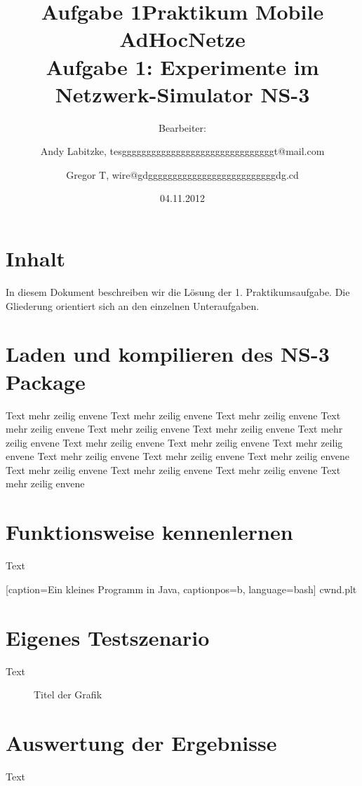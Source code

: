 \documentclass[12pt,a4paper,titlepage]{article}
\title{Aufgabe 1}
\begin{document}
\title{Praktikum Mobile AdHocNetze\\
	Aufgabe 1: Experimente im Netzwerk-Simulator NS-3}
\author{
Bearbeiter: \and
	Andy Labitzke, tesgggggggggggggggggggggggggggggggt@mail.com \and 
	Gregor T, wire@gdggggggggggggggggggggggggggdg.cd}
\date{04.11.2012}
\maketitle
\setcounter{page}{1}
\appendix

\section*{Inhalt}
In diesem Dokument beschreiben wir die Lösung der 1. Praktikumsaufgabe. Die Gliederung orientiert sich an den einzelnen Unteraufgaben.

\setcounter{section}{0}

\section{Laden und kompilieren des NS-3 Package}

Text mehr zeilig envene Text mehr zeilig envene Text mehr zeilig envene Text mehr zeilig envene Text mehr zeilig envene Text mehr zeilig envene Text mehr zeilig envene Text mehr zeilig envene Text mehr zeilig envene Text mehr zeilig envene Text mehr zeilig envene Text mehr zeilig envene Text mehr zeilig envene Text mehr zeilig envene Text mehr zeilig envene Text mehr zeilig envene Text mehr zeilig envene 

\section{Funktionsweise kennenlernen}

Text


	[caption={Ein kleines Programm in Java}\label{lst:javaclass}, %
		captionpos=b,
		language=bash] %
	{cwnd.plt}
 
 


\section{Eigenes Testszenario}

Text

\begin{figure}[h]
	\centering
	
	\caption{Titel der Grafik}
	\label{labelname}
\end{figure}



\section{Auswertung der Ergebnisse}

Text
\end{document}
